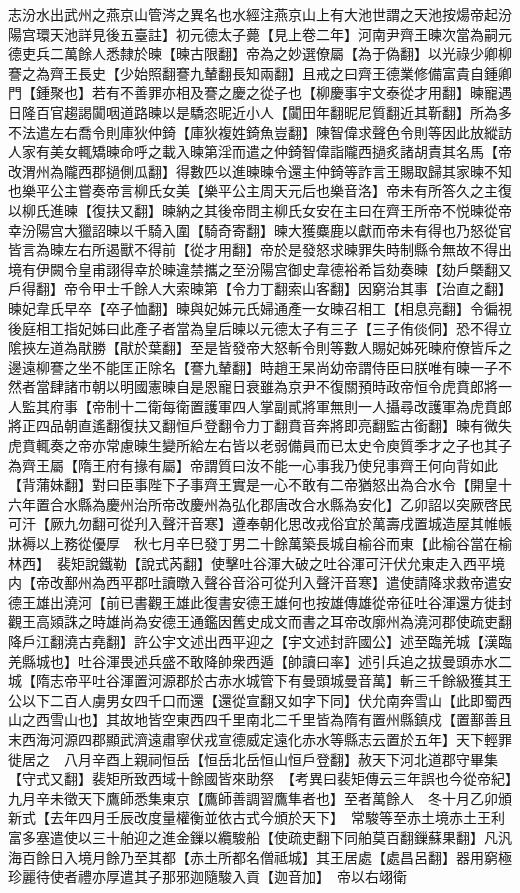 志汾水出武州之燕京山管涔之異名也水經注燕京山上有大池世謂之天池按煬帝起汾陽宫環天池詳見後五臺註】初元德太子薨【見上卷二年】河南尹齊王暕次當為嗣元德吏兵二萬餘人悉隸於暕【暕古限翻】帝為之妙選僚屬【為于偽翻】以光祿少卿柳謇之為齊王長史【少始照翻謇九輦翻長知兩翻】且戒之曰齊王德業修備富貴自鍾卿門【鍾聚也】若有不善罪亦相及謇之慶之從子也【柳慶事宇文泰從才用翻】暕寵遇日隆百官趨謁闐咽道路暕以是驕恣昵近小人【闐田年翻昵尼質翻近其靳翻】所為多不法遣左右喬令則庫狄仲錡【庫狄複姓錡魚豈翻】陳智偉求聲色令則等因此放縱訪人家有美女輒矯暕命呼之載入暕第淫而遣之仲錡智偉詣隴西撾炙諸胡責其名馬【帝改渭州為隴西郡撾側瓜翻】得數匹以進暕暕令還主仲錡等詐言王賜取歸其家暕不知也樂平公主嘗奏帝言柳氏女美【樂平公主周天元后也樂音洛】帝未有所答久之主復以柳氏進暕【復扶又翻】暕納之其後帝問主柳氏女安在主曰在齊王所帝不悦暕從帝幸汾陽宫大獵詔暕以千騎入圍【騎奇寄翻】暕大獲麋鹿以獻而帝未有得也乃怒從官皆言為暕左右所遏獸不得前【從才用翻】帝於是發怒求暕罪失時制縣令無故不得出境有伊闕令皇甫詡得幸於暕違禁攜之至汾陽宫御史韋德裕希旨劾奏暕【劾戶槩翻又戶得翻】帝令甲士千餘人大索暕第【令力丁翻索山客翻】因窮治其事【治直之翻】暕妃韋氏早卒【卒子恤翻】暕與妃姊元氏婦通產一女暕召相工【相息亮翻】令徧視後庭相工指妃姊曰此產子者當為皇后暕以元德太子有三子【三子侑倓侗】恐不得立隂挾左道為猒勝【猒於葉翻】至是皆發帝大怒斬令則等數人賜妃姊死暕府僚皆斥之邊遠柳謇之坐不能匡正除名【謇九輦翻】時趙王杲尚幼帝謂侍臣曰朕唯有暕一子不然者當肆諸市朝以明國憲暕自是恩寵日衰雖為京尹不復關預時政帝恒令虎賁郎將一人監其府事【帝制十二衛每衛置護軍四人掌副貳將軍無則一人攝尋改護軍為虎賁郎將正四品朝直遙翻復扶又翻恒戶登翻令力丁翻賁音奔將即亮翻監古銜翻】暕有微失虎賁輒奏之帝亦常慮暕生變所給左右皆以老弱備員而已太史令庾質季才之子也其子為齊王屬【隋王府有掾有屬】帝謂質曰汝不能一心事我乃使兒事齊王何向背如此【背蒲妹翻】對曰臣事陛下子事齊王實是一心不敢有二帝猶怒出為合水令【開皇十六年置合水縣為慶州治所帝改慶州為弘化郡唐改合水縣為安化】乙卯詔以突厥啓民可汗【厥九勿翻可從刋入聲汗音寒】遵奉朝化思改戎俗宜於萬壽戌置城造屋其帷帳牀褥以上務從優厚　秋七月辛巳發丁男二十餘萬築長城自榆谷而東【此榆谷當在榆林西】　裴矩說鐵勒【說式芮翻】使擊吐谷渾大破之吐谷渾可汗伏允東走入西平境内【帝改鄯州為西平郡吐讀暾入聲谷音浴可從刋入聲汗音寒】遣使請降求救帝遣安德王雄出澆河【前已書觀王雄此復書安德王雄何也按雄傳雄從帝征吐谷渾還方徙封觀王高熲誅之時雄尚為安德王通鑑因舊史成文而書之耳帝改廓州為澆河郡使疏吏翻降戶江翻澆古堯翻】許公宇文述出西平迎之【宇文述封許國公】述至臨羌城【漢臨羌縣城也】吐谷渾畏述兵盛不敢降帥衆西遁【帥讀曰率】述引兵追之拔曼頭赤水二城【隋志帝平吐谷渾置河源郡於古赤水城管下有曼頭城曼音萬】斬三千餘級獲其王公以下二百人虜男女四千口而還【還從宣翻又如字下同】伏允南奔雪山【此即蜀西山之西雪山也】其故地皆空東西四千里南北二千里皆為隋有置州縣鎮戍【置鄯善且末西海河源四郡顯武濟遠肅寧伏戎宣德威定遠化赤水等縣志云置於五年】天下輕罪徙居之　八月辛酉上親祠恒岳【恒岳北岳恒山恒戶登翻】赦天下河北道郡守畢集【守式又翻】裴矩所致西域十餘國皆來助祭　【考異曰裴矩傳云三年誤也今從帝紀】　九月辛未徵天下鷹師悉集東京【鷹師善調習鷹隼者也】至者萬餘人　冬十月乙卯頒新式【去年四月壬辰改度量權衡並依古式今頒於天下】　常駿等至赤土境赤土王利富多塞遣使以三十舶迎之進金鏁以纜駿船【使疏吏翻下同舶莫百翻鏁蘇果翻】凡汎海百餘日入境月餘乃至其都【赤土所都名僧祗城】其王居處【處昌呂翻】器用窮極珍麗待使者禮亦厚遣其子那邪迦隨駿入貢【迦音加】　帝以右翊衛